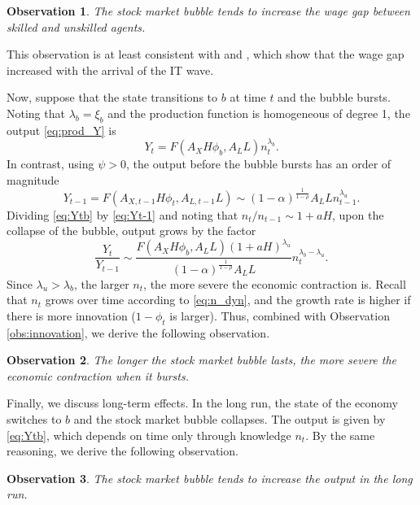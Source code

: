 \documentclass[a4paper,12pt]{article}
\numberwithin{equation}{section}
\theoremstyle{plain}
\newtheorem{obs}{Observation}
\begin{document}
\begin{obs}\label{obs:wL}
The stock market bubble tends to increase the wage gap between skilled and unskilled agents.
\end{obs}

This observation is at least consistent with \citet[Figure 18]{JovanovicRousseau2005} and \citet[\S4]{VanReenen2011}, which show that the wage gap increased with the arrival of the IT wave.

Now, suppose that the state transitions to $b$ at time $t$ and the bubble bursts. Noting that $\lambda_b=\xi_b$ and the production function is homogeneous of degree 1, the output \eqref{eq:prod_Y} is
\begin{equation}
    Y_t=F(A_XH\phi_b,A_LL)n_t^{\lambda_b}. \label{eq:Ytb}
\end{equation}
In contrast, using $\psi>0$, the output before the bubble bursts has an order of magnitude
\begin{equation}
    Y_{t-1}=F(A_{X,t-1}H\phi_t,A_{L,t-1}L)\sim (1-\alpha)^\frac{1}{1-\rho}A_LLn_{t-1}^{\lambda_u}. \label{eq:Yt-1}
\end{equation}
Dividing \eqref{eq:Ytb} by \eqref{eq:Yt-1} and noting that $n_t/n_{t-1}\sim 1+aH$, upon the collapse of the bubble, output grows by the factor
\begin{equation*}
    \frac{Y_t}{Y_{t-1}}\sim \frac{F(A_XH\phi_b,A_LL)(1+aH)^{\lambda_u}}{(1-\alpha)^\frac{1}{1-\rho}A_LL}n_t^{\lambda_b-\lambda_u}.
\end{equation*}
Since $\lambda_u>\lambda_b$, the larger $n_t$, the more severe the economic contraction is. Recall that $n_t$ grows over time according to \eqref{eq:n_dyn}, and the growth rate is higher if there is more innovation ($1-\phi_t$ is larger). Thus, combined with Observation \ref{obs:innovation}, we derive the following observation.

\begin{obs}\label{obs:contract}
The longer the stock market bubble lasts, the more severe the economic contraction when it bursts.
\end{obs}

Finally, we discuss long-term effects. In the long run, the state of the economy switches to $b$ and the stock market bubble collapses. The output is given by \eqref{eq:Ytb}, which depends on time only through knowledge $n_t$. By the same reasoning, we derive the following observation.

\begin{obs}\label{obs:output}
The stock market bubble tends to increase the output in the long run.
\end{obs}
\end{document}
